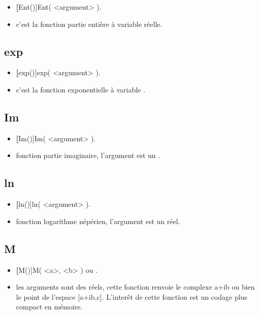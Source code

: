 \begin{itemize}
 \item \util \textbf[Ent()]{Ent( <argument> )}.
 \item \desc c'est la fonction partie entière à variable réelle.
\end{itemize}

\subsection{exp}

\begin{itemize}
 \item \util \textbf[exp()]{exp( <argument> )}.
 \item \desc  c'est la fonction exponentielle à variable .
\end{itemize}

\subsection{Im}

\begin{itemize}
 \item \util \textbf[Im()]{Im( <argument> )}.
 \item \desc fonction partie imaginaire, l'argument est un .
\end{itemize}

\subsection{ln}

\begin{itemize}
 \item \util \textbf[ln()]{ln( <argument> )}.
 \item \desc fonction logarithme népérien, l'argument est un réel.
\end{itemize}

\subsection{M}\label{cmdM}

\begin{itemize}
 \item \util \textbf[M()]{M( <a>, <b> )} ou .
 \item \desc les arguments sont des réels, cette fonction renvoie le complexe a+ib ou bien le point de l'espace [a+ib,c]. L'interêt de cette fonction est un codage plus compact en mémoire.
\end{itemize}

